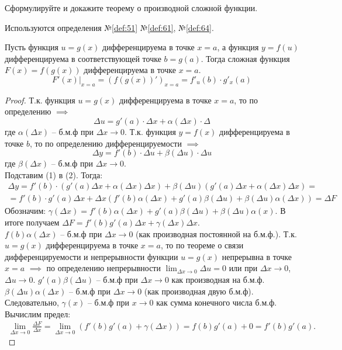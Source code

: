 \begin{question}
    Сформулируйте и докажите теорему о производной сложной функции.
\end{question}
\begin{used}
    Используются определения №\ref{def:51} №\ref{def:61}, №\ref{def:64}.
\end{used}
\begin{theorem}
    Пусть функция $u = g(x)$ дифференцируема в точке $x = a$, а функция $y = f(u)$ дифференцируема в соответствующей точке  $b = g(a)$.
    Тогда сложная функция $F(x) = f(g(x))$ дифференцируема в точке $x = a$. \[
        F'(x) |_{x = a} = \left(f(g(x))'\right)_{x = a} = f'_u(b) \cdot g'_x(a)
    \]
\end{theorem}
\begin{proof}
    Т.к. функция $u = g(x)$ дифференцируема в точке $x = a$, то по определению $\implies$\[
    \Delta u = g'(a) \cdot \Delta x + \alpha(\Delta x) \cdot \Delta \tag{1}
    \] 
    где $\alpha(\Delta x)$ -- б.м.ф при $\Delta x \to 0$.
    Т.к. функция $y = f(x)$ дифференцируема в точке  $b$, то по определению дифференцируемости  $\implies$ \[
        \Delta y = f'(b) \cdot \Delta u + \beta(\Delta u) \cdot \Delta u \tag{2}
    \] 
    где $\beta(\Delta x)$ -- б.м.ф при $\Delta x \to 0$. \\
    Подставим (1) в (2). Тогда:
    \begin{gather*}
        \Delta y = f'(b) \cdot \left( g'(a) \Delta x + \alpha(\Delta x) \Delta x \right) + \beta(\Delta u)\left( g'(a) \Delta x + \alpha(\Delta x) \Delta x \right) = \\
        = f'(b) \cdot  g'(a) \Delta x + \Delta x\left(f'(b) \alpha(\Delta x) + g'(a) \beta(\Delta u) + \beta(\Delta u) \alpha(\Delta x)\right) = \Delta F
    \end{gather*}
    Обозначим: $\gamma(\Delta x) = f'(b) \alpha(\Delta x) + g'(a) \beta(\Delta u) + \beta(\Delta u) \alpha(x)$. В итоге получаем $\Delta F = f'(b)g'(a)\Delta x + \gamma(\Delta x)\Delta x$. \\
    $f(b) \alpha(\Delta x)$ -- б.м.ф при $\Delta x \to 0$ (как производная постоянной на б.м.ф.). 
    Т.к. $u = g(x)$ дифференцируема в точке $x = a$, то по теореме о связи дифференцируемости и непрерывности функции $u = g(x)$ непрерывна в точке $x = a$  $\implies$ по определению непрерывности $\lim_{\Delta x \to 0} \Delta u = 0$ или при $\Delta x \to 0$, $\Delta u \to 0$. $g'(a) \beta(\Delta u)$ -- б.м.ф при $\Delta x \to  0$ как производная на б.м.ф. $\beta(\Delta u) \alpha(\Delta x)$ -- б.м.ф при $\Delta x \to  0$ (как производная двую б.м.ф).
    Следовательно, $\gamma(x)$ -- б.м.ф при $x \to 0$ как сумма конечного числа б.м.ф. \\
    Вычислим предел:
    \begin{gather*}
        \lim_{\Delta x \to 0} \frac{\Delta F}{\Delta x} = \lim_{\Delta x \to 0} \left( f'(b) g'(a) + \gamma(\Delta x) \right) = f(b)g'(a) + 0 = f'(b) g'(a).
    \end{gather*}
\end{proof}
\pagebreak



